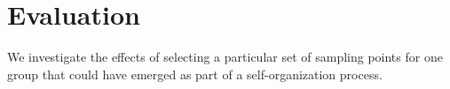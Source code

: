 \documentclass[conference]{IEEEtran}
\begin{document}
\section{Evaluation}
We investigate the effects of selecting a particular set of 
sampling points for one group that could have emerged as part
of a self-organization process.





\end{document}
